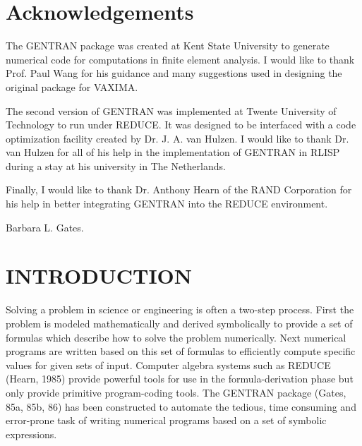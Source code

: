 \chapter*{Acknowledgements}

The GENTRAN package was created at Kent State University to generate
numerical
code for computations in finite element analysis.  I would like to thank
Prof. Paul Wang for his guidance and many suggestions used in designing
the original package for VAXIMA.

The second version of
GENTRAN was implemented at Twente University of
Technology to run under REDUCE.  It was designed to be interfaced with
a code optimization facility created by Dr. J. A. van Hulzen.  I would like
to thank Dr. van Hulzen for all of his help in the
implementation of GENTRAN in RLISP during a stay at his university in
The Netherlands.

Finally, I would like to thank Dr. Anthony Hearn
of the RAND Corporation
for his help in better integrating GENTRAN into the REDUCE environment.

Barbara L. Gates.

\tableofcontents

\chapter{INTRODUCTION}

Solving a problem in science or engineering is often a two-step
process.  First the problem is modeled mathematically and derived
symbolically to provide a set of formulas which describe how to
solve the problem numerically.  Next numerical programs are
written based on this set of formulas to efficiently
compute specific values for given sets of input.  Computer algebra
systems such as REDUCE (Hearn, 1985) provide powerful tools for use in the
formula-derivation phase but only provide primitive program-coding
tools.  The GENTRAN package (Gates, 85a, 85b, 86) has been constructed to
automate the tedious, time consuming and error-prone task of writing numerical
programs based on a set of symbolic expressions.

